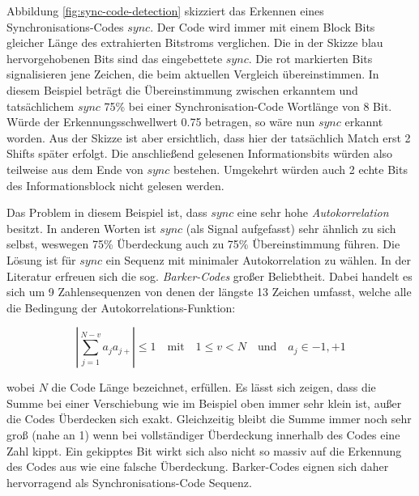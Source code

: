 Abbildung \ref{fig:sync-code-detection} skizziert das Erkennen eines Synchronisations-Codes $sync$. Der Code wird immer mit einem Block Bits gleicher Länge des extrahierten Bitstroms verglichen. Die in der Skizze blau hervorgehobenen Bits sind das eingebettete $sync$. Die rot markierten Bits signalisieren jene Zeichen, die beim aktuellen Vergleich übereinstimmen. In diesem Beispiel beträgt die Übereinstimmung zwischen erkanntem und tatsächlichem $sync$ 75\% bei einer Synchronisation-Code Wortlänge von 8 Bit. Würde der Erkennungsschwellwert 0.75 betragen, so wäre nun $sync$ erkannt worden. Aus der Skizze ist aber ersichtlich, dass hier der tatsächlich Match erst 2 Shifts später erfolgt. Die anschließend gelesenen Informationsbits würden also teilweise aus dem Ende von $sync$ bestehen. Umgekehrt würden auch 2 echte Bits des Informationsblock nicht gelesen werden.

Das Problem in diesem Beispiel ist, dass $sync$ eine sehr hohe \textit{Autokorrelation} besitzt. In anderen Worten ist $sync$ (als Signal aufgefasst) sehr ähnlich zu sich selbst, weswegen 75\% Überdeckung auch zu 75\% Übereinstimmung führen. Die Lösung ist für $sync$ ein Sequenz mit minimaler Autokorrelation zu wählen. In der Literatur\cite{huang2002blind}\cite{lie2006robust}\cite{chang2012location} erfreuen sich die sog. \textit{Barker-Codes}\cite{barker1953group} großer Beliebtheit. Dabei handelt es sich um 9 Zahlensequenzen von denen der längste 13 Zeichen umfasst, welche alle die Bedingung der Autokorrelations-Funktion:

	 \begin{equation}
		 | \sum\limits_{j=1}^{N-v} a_j {a}_{j+} | \leq 1 \quad\mbox{mit}\quad 1 \leq v < N \quad\mbox{und}\quad a_j \in {-1,+1}
	 	\label{equ:barker-correlation}
	 \end{equation}

wobei $N$ die Code Länge bezeichnet, erfüllen. Es lässt sich zeigen, dass die Summe bei einer Verschiebung wie im Beispiel oben immer sehr klein ist, außer die Codes Überdecken sich exakt. Gleichzeitig bleibt die Summe immer noch sehr groß (nahe an 1) wenn bei vollständiger Überdeckung innerhalb des Codes eine Zahl kippt. Ein gekipptes Bit wirkt sich also nicht so massiv auf die Erkennung des Codes aus wie eine falsche Überdeckung. Barker-Codes eignen sich daher hervorragend als Synchronisations-Code Sequenz. 

